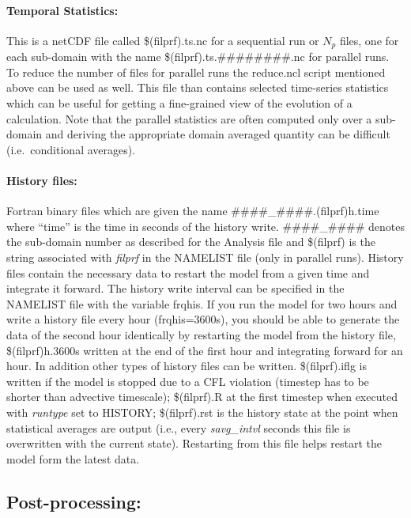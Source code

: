 \documentclass[11pt,a4paper]{article}
\begin{document}
\paragraph{Temporal Statistics:}  This is a netCDF file called
\$(filprf).ts.nc for a sequential run or $N_p$ files,
one for each sub-domain with the name \$(filprf).ts.\#\#\#\#\#\#\#\#.nc
for parallel runs. To reduce the number of files for parallel runs
the reduce.ncl script mentioned above can be used as well.
This file than contains selected time-series statistics
which can be useful for getting a fine-grained view of the evolution of a
calculation. Note that the parallel statistics are often computed
only over a sub-domain and deriving the appropriate domain averaged
quantity can be difficult (i.e.\ conditional averages).

\paragraph{History files:}

Fortran binary files which are given the name
\#\#\#\#\_\#\#\#\#.(filprf)h.time where ``time'' is the time in seconds
of the history write. \#\#\#\#\_\#\#\#\# denotes the sub-domain number
as described for the Analysis file and \$(filprf) is the string associated
with \emph{filprf} in the NAMELIST file (only in parallel runs).
History files contain the necessary data to restart the model from
a given time and integrate it forward. The history write interval
can be specified in the NAMELIST file with the variable frqhis.
If you run the model for two hours and write a history file every
hour (frqhis=3600s), you should be able to generate the data of
the second hour identically by restarting the model from the
history file, \$(filprf)h.3600s written at the end of the first
hour and integrating forward for an hour.
In addition other types of history files can be written.
\$(filprf).iflg is written if the model is stopped due to a CFL
violation (timestep has to be shorter than advective timescale);
\$(filprf).R at the first timestep when executed with \emph{runtype}
set to HISTORY; \$(filprf).rst is the history state at the point when
statistical averages are output (i.e., every \emph{savg\_intvl} seconds
this file is overwritten with the current state). Restarting from this
file helps restart the model form the latest data.

\subsection{Post-processing:}
\end{document}
